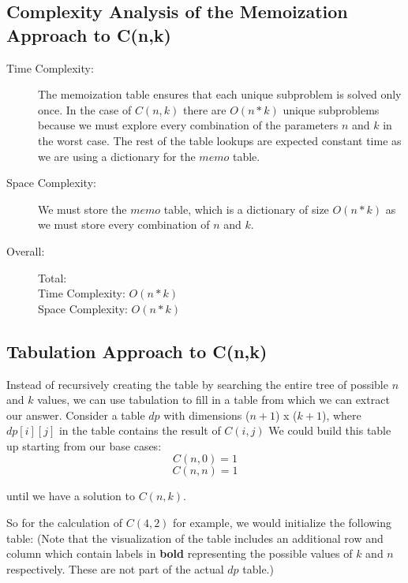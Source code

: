 \subsection{Complexity Analysis of the Memoization Approach to C(n,k)}
\begin{description}
    \item[Time Complexity:]
        The memoization table ensures that each unique subproblem is solved only once.
        In the case of $C(n,k)$ there are $O(n * k)$ unique subproblems because we must explore every combination of the parameters $n$ and $k$ in the worst case.
        The rest of the table lookups are expected constant time as we are using a dictionary for the $memo$ table.

    \item[Space Complexity:] 
        We must store the $memo$ table, which is a dictionary of size $O(n * k)$ as we must store every combination of $n$ and $k$.

    \item[Overall:] Total:\\
        Time Complexity: $O(n * k)$\\
        Space Complexity: $O(n * k)$
    
\end{description}

\subsection{Tabulation Approach to C(n,k)}
Instead of recursively creating the table by searching the entire tree of possible $n$ and $k$ values, we can use tabulation to fill in a table from which we can extract our answer.
Consider a table $dp$ with dimensions ($n+1$) x ($k+1$), where $dp[i][j]$ in the table contains the result of $C(i,j)$
We could build this table up starting from our base cases:
$$C(n,0) = 1$$
$$C(n,n) = 1$$

until we have a solution to $C(n,k)$.

So for the calculation of $C(4,2)$ for example, we would initialize the following table:
(Note that the visualization of the table includes an additional row and column which contain labels in \textbf{bold} representing the possible values of $k$ and $n$ respectively. These are not part of the actual $dp$ table.)

